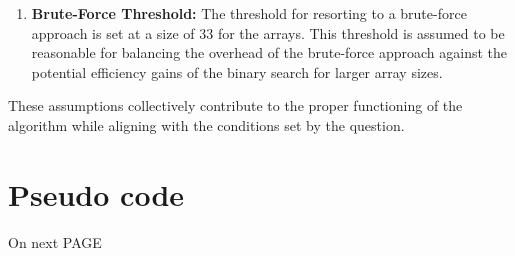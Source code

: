 \documentclass{article}
\begin{document}
\begin{enumerate}
    \item \textbf{Brute-Force Threshold:} The threshold for resorting to a brute-force approach is set at a size of 33 for the arrays. This threshold is assumed to be reasonable for balancing the overhead of the brute-force approach against the potential efficiency gains of the binary search for larger array sizes.
\end{enumerate}

These assumptions collectively contribute to the proper functioning of the algorithm while aligning with the conditions set by the question.


\section{Pseudo code}
\begin{center}
\Huge On next PAGE
\end{center}

\vfill
\end{document}
